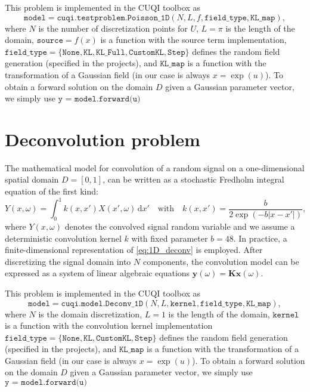 \documentclass[11pt,a4paper]{article}
\newcommand{\abs}[1]{\left\vert#1\right\vert}
\newcommand{\dd}{\mathrm{d}}
\newcommand{\ve}[1]{\bm{#1}}
\newcommand{\mat}[1]{\mathbf{#1}}
\begin{document}
This problem is implemented in the CUQI toolbox as $$\texttt{model}=\texttt{cuqi.testproblem.Poisson\_1D}(N, L, f, \texttt{field\_type}, \texttt{KL\_map}),$$
where $N$ is the number of discretization points for $U$, $L=\pi$ is the length of the domain, $\texttt{source}=f(x) $ is a function with the source term implementation, $\texttt{field\_type}=\{\texttt{None},\texttt{KL},\texttt{KL\_Full},\allowbreak\texttt{CustomKL},\texttt{Step}\}$ defines the random field generation (specified in the projects), and $\texttt{KL\_map}$ is a function with the transformation of a Gaussian field (in our case is always $x=\exp(u)$). To obtain a forward solution on the domain $D$ given a Gaussian parameter vector, we simply use $\texttt{y~=~model.forward(u)}$




\section{Deconvolution problem}
The mathematical model for convolution of a random signal on a one-dimensional spatial domain $D=[0,1]$, can be written as a stochastic Fredholm integral equation of the first kind:
\begin{equation}\label{eq:1D_deconv}
Y(x,\omega) = \int_{0}^{1} k(x,x')X(x',\omega)\,\dd x' \quad\text{with}\quad k(x,x') = \frac{b}{2\exp\left(-b\abs{x-x'}\right)},
\end{equation}
where $Y(x,\omega)$ denotes the convolved signal random variable and we assume a deterministic convolution kernel $k$ with fixed parameter $b=48$. In practice, a finite-dimensional representation of \eqref{eq:1D_deconv} is employed. After discretizing the signal domain into $N$ components, the convolution model can be expressed as a system of linear algebraic equations $\ve{y}(\omega)=\mat{K}\ve{x}(\omega)$. 

This problem is implemented in the CUQI toolbox as $$\texttt{model}=\texttt{cuqi.model.Deconv\_1D}(N, L, \texttt{kernel}, \texttt{field\_type}, \texttt{KL\_map}),$$
where $N$ is the domain discretization, $L=1$ is the length of the domain, $\texttt{kernel}$ is a function with the convolution kernel implementation $\texttt{field\_type}=\{\texttt{None},\texttt{KL},\texttt{CustomKL},\texttt{Step}\}$ defines the random field generation (specified in the projects), and $\texttt{KL\_map}$ is a function with the transformation of a Gaussian field (in our case is always $x=\exp(u)$). To obtain a forward solution on the domain $D$ given a Gaussian parameter vector, we simply use $\texttt{y~=~model.forward(u)}$
\end{document}
